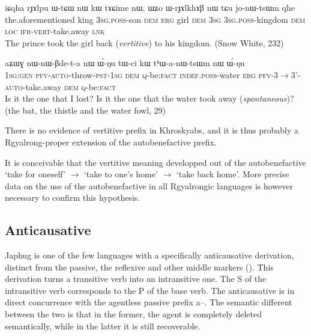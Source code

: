 \documentclass[oldfontcommands,oneside,a4paper,11pt]{article}
\newcommand{\ipa}[1]{{\phon \mbox{#1}}} %
\begin{document}
\begin{exe}
\ex \label{ex:jonWtsWm}
\gll
\ipa{iɕqha} 	\ipa{rɟɤlpu} 	\ipa{ɯ-tɕɯ} 	\ipa{nɯ} 	\ipa{kɯ} 	\ipa{tɤɕime} 	\ipa{nɯ,} 	\ipa{ɯʑo} 	\ipa{ɯ-rɟɤlkhɤβ} 	\ipa{nɯ} 	\ipa{tɕu} 	\ipa{jo-nɯ-tsɯm} 	\ipa{qhe} \\
the.aforementioned king \textsc{3sg.poss}-son \textsc{dem} \textsc{erg} girl \textsc{dem} \textsc{3sg} \textsc{3sg.poss}-kingdom \textsc{dem} \textsc{loc} \textsc{ifr-vert}-take.away \textsc{lnk} \\
\glt The prince took the girl back (\textit{vertitive}) to his kingdom. (Snow White, 232)
\end{exe}



\begin{exe}
\ex \label{ex:thanWtsWm}
\gll
\ipa{aʑɯɣ} 	\ipa{nɯ-nɯ-βde-t-a} 	\ipa{nɯ} 	\ipa{ɯ́-ŋu} 	\ipa{tɯ-ci} 	\ipa{kɯ} 	\ipa{tʰɯ-a-nɯ-tsɯm} 	\ipa{nɯ} 	\ipa{ɯ́-ŋu} \\
\textsc{1sg:gen} \textsc{pfv-auto}-throw-\textsc{pst-1sg} \textsc{dem} \textsc{q}-be:\textsc{fact} \textsc{indef.poss}-water \textsc{erg} \textsc{pfv}-3$\rightarrow$3'-\textsc{auto}-take.away \textsc{dem} \textsc{q}-be:\textsc{fact} \\
\glt Is it the one that I lost? Is it the one that the water took away (\textit{spontaneous})? (the bat, the thistle and the water fowl, 29)
\end{exe}


There is no evidence of vertitive prefix in Khroskyabs, and it is thus probably a Rgyalrong-proper extension of the autobenefactive prefix.


It is conceivable that the vertitive meaning developped out of the autobenefactive `take for oneself' $\rightarrow$ `take to one's home' $\rightarrow$ `take back home'. More precise data on the use of the autobenefactive in all Rgyalrongic languages is however necessary to confirm this hypothesis.

\subsection{Anticausative}
Japhug is one of the few languages with a specifically anticausative derivation, distinct from the passive, the reflexive and other middle markers (\citealt{jacques12demotion}). This derivation turns a transitive verb into an intransitive one. The S of the intransitive verb corresponds to the P of the base verb. The anticausative is in direct concurrence with the agentless passive prefix \ipa{a--}. The semantic different between the two is that in the former, the agent is completely deleted semantically, while in the latter it is still recoverable.
\end{document}
